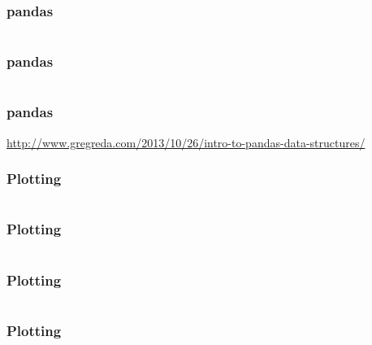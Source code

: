 \documentclass{formation}
\begin{document}
\begin{frame}
  \frametitle{pandas}
  \inputminted[linenos,fontsize=\small]{python}{/home/fmg/formations-code-illustration/pandas_6.py}
\end{frame}

\begin{frame}
  \frametitle{pandas}
  \inputminted[linenos,fontsize=\small]{python}{/home/fmg/formations-code-illustration/pandas_7.py}
\end{frame}

\begin{frame}
  \frametitle{pandas}
    \vspace{5mm}
    \url{http://www.gregreda.com/2013/10/26/intro-to-pandas-data-structures/}
\end{frame}

\begin{frame}
  \frametitle{Plotting}
  \begin{minipage}[c]{0.49\linewidth}
    \inputminted[linenos,fontsize=\small]{python}{/home/fmg/formations-code-illustration/pyplot_1.py}
  \end{minipage}\hfill
  \begin{minipage}[c]{0.49\linewidth}
  \end{minipage}\hfill
\end{frame}

\begin{frame}
  \frametitle{Plotting}
  \begin{minipage}[c]{0.55\linewidth}
    \inputminted[linenos,fontsize=\small]{python}{/home/fmg/formations-code-illustration/pyplot_2.py}
  \end{minipage}\hfill
  \begin{minipage}[c]{0.43\linewidth}
  \end{minipage}\hfill
\end{frame}

\begin{frame}
  \frametitle{Plotting}
  \inputminted[linenos,fontsize=\small]{python}{/home/fmg/formations-code-illustration/pyplot_3.py}
  \vspace{-55mm}
\end{frame}

\begin{frame}
  \frametitle{Plotting}
  \inputminted[linenos,fontsize=\small]{python}{/home/fmg/formations-code-illustration/pyplot_4.py}
\end{frame}
\end{document}

